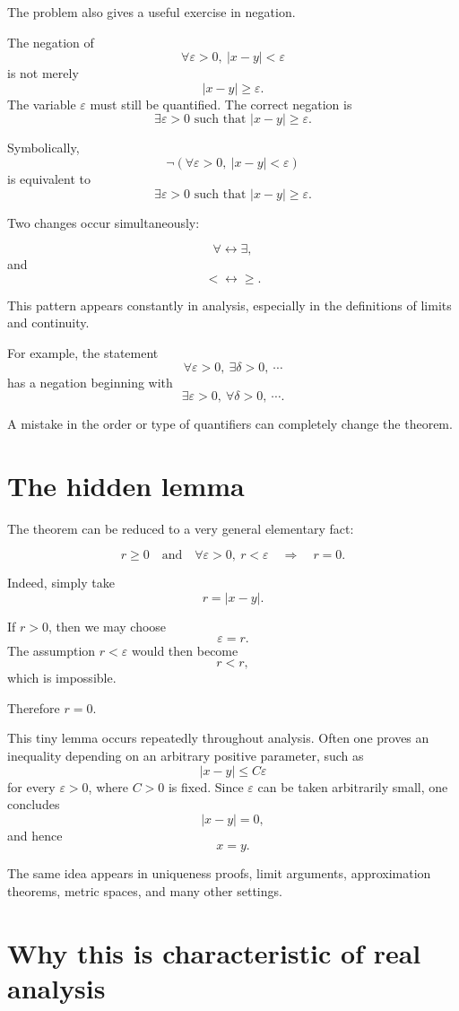 \documentclass{essay}
\begin{document}
The problem also gives a useful exercise in negation.

The negation of
\[ \forall \varepsilon>0,\ |x-y|<\varepsilon \]
is not merely
\[ |x-y|\ge\varepsilon. \]
The variable \(\varepsilon\) must still be quantified. The correct negation is
\[ \exists \varepsilon>0 \text{ such that } |x-y|\ge\varepsilon. \]

Symbolically,
\[ \neg \left( \forall \varepsilon>0,\ |x-y|<\varepsilon \right) \]
is equivalent to
\[ \exists \varepsilon>0 \text{ such that } |x-y|\ge\varepsilon. \]

Two changes occur simultaneously:

\[ \forall \longleftrightarrow \exists, \]
and
\[ < \longleftrightarrow \ge. \]

This pattern appears constantly in analysis, especially in the definitions of limits and continuity.

For example, the statement
\[ \forall \varepsilon>0,\ \exists \delta>0,\ \cdots \]
has a negation beginning with
\[ \exists \varepsilon>0,\ \forall \delta>0,\ \cdots. \]

A mistake in the order or type of quantifiers can completely change the theorem.

\section{The hidden lemma}

The theorem can be reduced to a very general elementary fact:

\[ r\ge0 \quad\text{and}\quad \forall \varepsilon>0,\ r<\varepsilon \quad\Longrightarrow\quad r=0. \]

Indeed, simply take
\[ r=|x-y|. \]

If \(r>0\), then we may choose
\[ \varepsilon=r. \]
The assumption \(r<\varepsilon\) would then become
\[ r<r, \]
which is impossible.

Therefore \(r=0\).

This tiny lemma occurs repeatedly throughout analysis. Often one proves an inequality depending on an arbitrary positive parameter, such as
\[ |x-y|\le C\varepsilon \]
for every \(\varepsilon>0\), where \(C>0\) is fixed. Since \(\varepsilon\) can be taken arbitrarily small, one concludes
\[ |x-y|=0, \]
and hence
\[ x=y. \]

The same idea appears in uniqueness proofs, limit arguments, approximation theorems, metric spaces, and many other settings.

\section{Why this is characteristic of real analysis}
\end{document}
